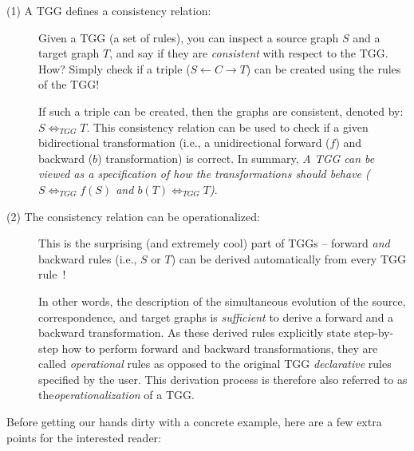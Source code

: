 \begin{description}

\item[(1) A TGG defines a consistency relation:]%
Given a TGG (a set of rul\-es), you can inspect a source graph $S$ and a target graph $T$, and say if they are \emph{consistent} with respect to the TGG. How?
Simply check if a triple ($S\leftarrow C\rightarrow T$) can be created using the rules of the TGG!

\vspace{0.25cm}

If such a triple can be created, then the graphs are consistent, denoted by: $S \Leftrightarrow_{TGG} T$. This consistency relation can be used to check if a
given bidirectional transformation (i.e., a unidirectional forward ($f$) and backward ($b$) transformation) is correct. In summary, \emph{A TGG can be viewed as
a specification of how the transformations \emph{should} behave ($S \Leftrightarrow_{TGG} f(S)$ and $b(T) \Leftrightarrow_{TGG} T$)}.
	
\item[(2) The consistency relation can be operationalized:]%
This is the surprising (and extremely cool) part of TGGs -- forward \emph{and} backward rules (i.e., $S$ or $T$) can be derived automatically from every TGG
rule~\cite{Giese2010,Hermann2011a}! 

\vspace{0.25cm}

In other words, the description of the simultaneous evolution of the source, correspondence, and target graphs is \emph{sufficient} to derive a forward and
a backward transformation. As these derived rules explicitly state step-by-step how to perform forward and backward transformations, they are called
\emph{operational} rules as opposed to the original TGG \emph{declarative} rules specified by the user. This derivation process is therefore also referred to
as the\emph{operationalization} of a TGG.
	
\end{description}

Before getting our hands dirty with a concrete example, here are a few extra points for the interested reader:  

